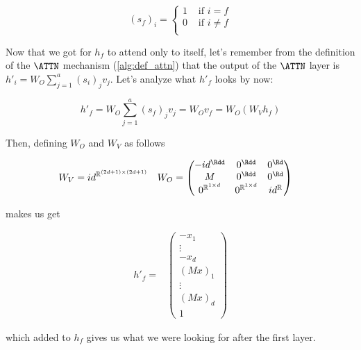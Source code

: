\[
(s_f)_i = \begin{cases}
            1 &\text{ if } i = f    \\
            0 &\text{ if } i \neq f \\
          \end{cases}
\]



\medskip


Now that we got for $h_f$ to attend only to itself, let's remember from the definition of the $\ATTN$ mechanism (\ref{alg:def_attn}) that the output of the $\ATTN$ layer is $h'_i = W_O \sum_{j=1}^a (s_i)_j v_j$. 
Let's analyze what $h'_f$ looks by now:

\[
h'_f = W_O \sum_{j=1}^a (s_f)_j v_j = W_O v_f = W_O (W_V h_f)
\]

\noindent Then, defining $W_O$ and $W_V$ as follows

\begin{align*}
    W_V &= id^{\mathbb{R}^{(2d+1)\times (2d+1)}}
    & 
    W_O &= \left(\begin{matrix}
                -id^{\Rdd}                 &0^{\Rdd}                   &0^{\Rd} \\
                M                          &0^{\Rdd}                   &0^{\Rd} \\
                0^{\mathbb{R}^{1\times d}} &0^{\mathbb{R}^{1\times d}} &id^{\mathbb{R}}
          \end{matrix}\right)
\end{align*}

\noindent makes us get

\begin{align*}
    h'_f = 
    & \left( \begin{matrix} -x_1    \\ \vdots \\ -x_d    \\ (Mx)_1 \\ \vdots \\ (Mx)_d \\ 1 \end{matrix} \right)
\end{align*}

\noindent which added to $h_f$ gives us what we were looking for after the first layer.



